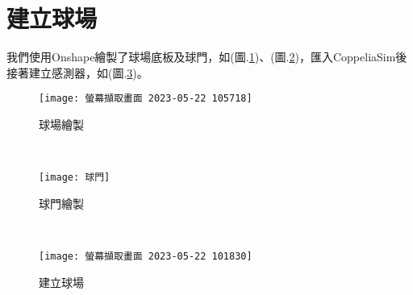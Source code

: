 \section{建立球場}
我們使用Onshape繪製了球場底板及球門，如(圖.\ref{球場繪製})、(圖.\ref{球門繪製})，匯入CoppeliaSim後接著建立感測器，如(圖.\ref{建立球場})。\
\begin{figure}[hbt!]
\begin{center}
\texttt{[image: 螢幕擷取畫面 2023-05-22 105718]}
\caption{\Large 球場繪製}\label{球場繪製}
\end{center}
\end{figure}\
\begin{figure}[hbt!]
\begin{center}
\texttt{[image: 球門]}
\caption{\Large 球門繪製}\label{球門繪製}
\end{center}
\end{figure}\
\begin{figure}[hbt!]
\begin{center}
\texttt{[image: 螢幕擷取畫面 2023-05-22 101830]}
\caption{\Large 建立球場}\label{建立球場}
\end{center}
\end{figure}\
\newpage

